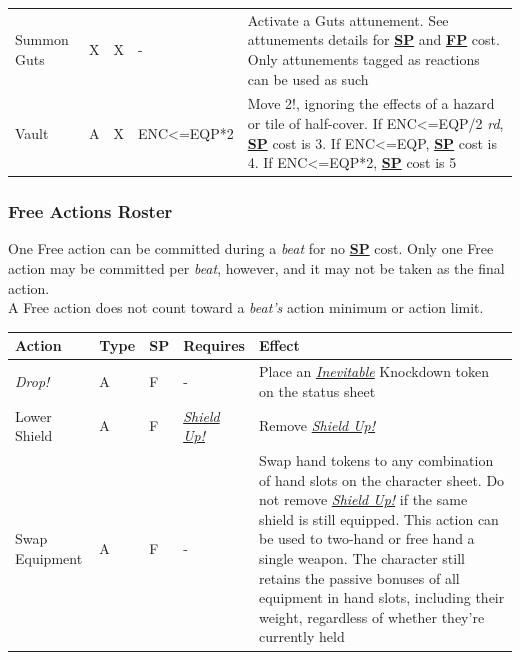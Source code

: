 \documentclass[12pt]{article}
\newcommand{\refto}[1]{\hyperlink{#1}{\textbf{#1}}}
\newcommand{\reftoit}[1]{\hyperlink{#1}{\emph{#1}}}
\begin{document}
\begin{center}
\begin{tabularx}{\textwidth}{p{}p{}p{}p{}p{}}
Summon Guts & X & X & - & Activate a Guts attunement. See attunements details for \refto{SP} and \refto{FP} cost. Only attunements tagged as reactions can be used as such\\
Vault & A & X & ENC<=EQP*2 & Move 2!, ignoring the effects of a hazard or tile of half-cover.\newline
If ENC<=EQP/2 \emph{rd}, \refto{SP} cost is 3.\newline
If ENC<=EQP, \refto{SP} cost is 4.\newline
If ENC<=EQP*2, \refto{SP} cost is 5\\
\hline
\end{tabularx}
\end{center}

\pagebreak

\subsubsection{Free Actions Roster}
One Free action can be committed during a \emph{beat} for no \refto{SP} cost. Only one Free action may be committed per \emph{beat}, however, and it may not be taken as the final action.\\
A Free action does not count toward a \emph{beat’s} action minimum or action limit.\\
\begin{center}
\begin{tabularx}{\textwidth}{p{}p{}p{}p{}p{}}
\hline
\rowcolor{white} \textbf{Action} & \textbf{Type} & \textbf{SP} & \textbf{Requires} & \textbf{Effect}\setcounter{rownum}{0}\\
\hline
\emph{Drop!} & A & F & - & Place an \reftoit{Inevitable} Knockdown token on the status sheet\\
Lower Shield & A & F & \reftoit{Shield Up!} & Remove \reftoit{Shield Up!}\\
Swap Equipment & A & F & - & Swap hand tokens to any combination of hand slots on the character sheet.\newline
Do not remove \reftoit{Shield Up!} if the same shield is still equipped.\newline
This action can be used to two-hand or free hand a single weapon.\newline
The character still retains the passive bonuses of all equipment in hand slots, including their weight, regardless of whether they’re currently held\\
\hline
\end{tabularx}
\end{center}
\end{document}
